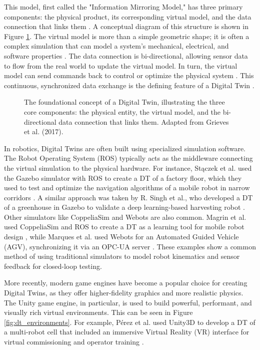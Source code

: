 This model, first called the "Information Mirroring Model," has three primary components: the physical product, its corresponding virtual model, and the data connection that links them \cite{Grieves2017, Alnowaiser2023}. A conceptual diagram of this structure is shown in Figure \ref{fig:dt_concept}. The virtual model is more than a simple geometric shape; it is often a complex simulation that can model a system's mechanical, electrical, and software properties \cite{Leng2021}. The data connection is bi-directional, allowing sensor data to flow from the real world to update the virtual model. In turn, the virtual model can send commands back to control or optimize the physical system \cite{Grieves2017, Leng2021}. This continuous, synchronized data exchange is the defining feature of a Digital Twin \cite{Alnowaiser2023}.

\begin{figure}[h]
\centering
\caption{The foundational concept of a Digital Twin, illustrating the three core components: the physical entity, the virtual model, and the bi-directional data connection that links them. Adapted from Grieves et al. (2017).}
\label{fig:dt_concept}
\end{figure}

In robotics, Digital Twins are often built using specialized simulation software. The Robot Operating System (ROS) typically acts as the middleware connecting the virtual simulation to the physical hardware. For instance, Stączek et al. used the Gazebo simulator with ROS to create a DT of a factory floor, which they used to test and optimize the navigation algorithms of a mobile robot in narrow corridors \cite{Staczek2021}. A similar approach was taken by R. Singh et al., who developed a DT of a greenhouse in Gazebo to validate a deep learning-based harvesting robot \cite{Singh2024a}. Other simulators like CoppeliaSim and Webots are also common. Magrin et al. used CoppeliaSim and ROS to create a DT as a learning tool for mobile robot design \cite{Magrin2021}, while Marques et al. used Webots for an Automated Guided Vehicle (AGV), synchronizing it via an OPC-UA server \cite{Marques2024}. These examples show a common method of using traditional simulators to model robot kinematics and sensor feedback for closed-loop testing.

More recently, modern game engines have become a popular choice for creating Digital Twins, as they offer higher-fidelity graphics and more realistic physics. The Unity game engine, in particular, is used to build powerful, performant, and visually rich virtual environments. This can be seen in Figure \ref{fig:dt_environments}. For example, Pérez et al. used Unity3D to develop a DT of a multi-robot cell that included an immersive Virtual Reality (VR) interface for virtual commissioning and operator training \cite{Perez2020}.

